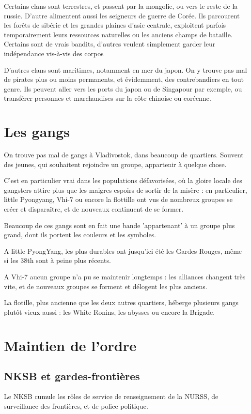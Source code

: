 \documentclass[10pt,a4paper]{book}
\begin{document}
Certains clans sont terrestres, et passent par la mongolie, ou vers le reste de la russie. D'autre alimentent aussi les seigneurs de guerre de Corée. Ils parcourent les forêts de sibérie et les grandes plaines d'asie centrale, exploitent parfois temporairement leurs ressources naturelles ou les anciens champs de bataille. Certains sont de vrais bandits, d'autres veulent simplement garder leur indépendance vis-à-vis des corpos

D'autres clans sont maritimes, notamment en mer du japon. On y trouve pas mal de pirates plus ou moins permanents, et évidemment, des contrebandiers en tout genre. Ils peuvent aller vers les ports du japon ou de Singapour par exemple, ou transférer personnes et marchandises sur la côte chinoise ou coréenne.
\section{Les gangs}
On trouve pas mal de gangs à Vladivostok, dans beaucoup de quartiers. Souvent des jeunes, qui souhaitent rejoindre un groupe, appartenir à quelque chose.

C'est en particulier vrai dans les populations défavorisées, où la gloire locale des gangsters attire plus que les maigres espoirs de sortir de la misère : en particulier, little Pyongyang, Vhi-7 ou encore la flottille ont vus de nombreux groupes se créer et disparaître, et de nouveaux continuent de se former.

Beaucoup de ces gangs sont en fait une bande 'appartenant' à un groupe plus grand, dont ils portent les couleurs et les symboles.

A little PyongYang, les plus durables ont jusqu'ici été les Gardes Rouges, même si les 38th sont à peine plus récents.

A Vhi-7 aucun groupe n'a pu se maintenir longtemps : les alliances changent très vite, et de nouveaux groupes se forment et délogent les plus anciens.

La flotille, plus ancienne que les deux autres quartiers, héberge plusieurs gangs plutôt vieux aussi : les White Ronins, les abysses ou encore la Brigade. 
\section{Maintien de l'ordre}
\subsection{NKSB et gardes-frontières}
Le NKSB cumule les rôles de service de renseignement de la NURSS, de surveillance des frontières, et de police politique.
\end{document}
